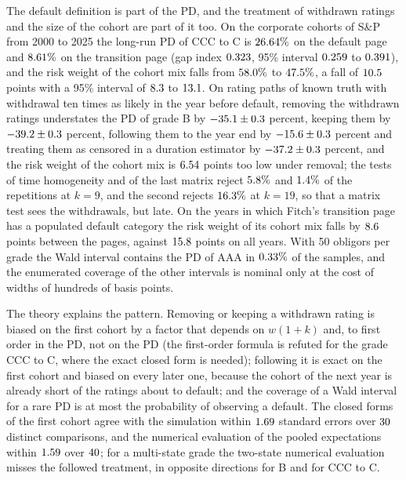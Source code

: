 The default definition is part of the PD, and the treatment of withdrawn ratings and the size of the cohort are part of it too. On the corporate cohorts of S\&P from 2000 to 2025 the long-run PD of CCC to C is $26.64\%$ on the default page and $8.61\%$ on the transition page (gap index $0.323$, 95\% interval $0.259$ to $0.391$), and the risk weight of the cohort mix falls from $58.0\%$ to $47.5\%$, a fall of $10.5$ points with a 95\% interval of $8.3$ to $13.1$. On rating paths of known truth with withdrawal ten times as likely in the year before default, removing the withdrawn ratings understates the PD of grade B by $-35.1\pm0.3$ percent, keeping them by $-39.2\pm0.3$ percent, following them to the year end by $-15.6\pm0.3$ percent and treating them as censored in a duration estimator by $-37.2\pm0.3$ percent, and the risk weight of the cohort mix is $6.54$ points too low under removal; the tests of time homogeneity and of the last matrix reject $5.8\%$ and $1.4\%$ of the repetitions at $k=9$, and the second rejects $16.3\%$ at $k=19$, so that a matrix test sees the withdrawals, but late. On the years in which Fitch's transition page has a populated default category the risk weight of its cohort mix falls by $8.6$ points between the pages, against $15.8$ points on all years. With 50 obligors per grade the Wald interval contains the PD of AAA in $0.33\%$ of the samples, and the enumerated coverage of the other intervals is nominal only at the cost of widths of hundreds of basis points. %

The theory explains the pattern. Removing or keeping a withdrawn rating is biased on the first cohort by a factor that depends on $w(1+k)$ and, to first order in the PD, not on the PD (the first-order formula is refuted for the grade CCC to C, where the exact closed form is needed); following it is exact on the first cohort and biased on every later one, because the cohort of the next year is already short of the ratings about to default; and the coverage of a Wald interval for a rare PD is at most the probability of observing a default. The closed forms of the first cohort agree with the simulation within $1.69$ standard errors over $30$ distinct comparisons, and the numerical evaluation of the pooled expectations within $1.59$ over $40$; for a multi-state grade the two-state numerical evaluation misses the followed treatment, in opposite directions for B and for CCC to C. %

